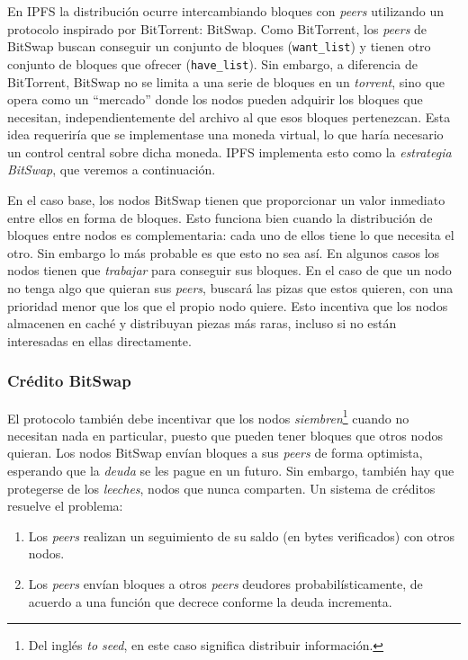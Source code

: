 \documentclass[12pt]{article} %
\begin{document}
En IPFS la distribución ocurre intercambiando bloques con \textit{peers} utilizando un protocolo inspirado por BitTorrent: BitSwap. Como BitTorrent, los \textit{peers} de BitSwap buscan conseguir un conjunto de bloques (\texttt{want\_list}) y tienen otro conjunto de bloques que ofrecer (\texttt{have\_list}). Sin embargo, a diferencia de BitTorrent, BitSwap no se limita a una serie de bloques en un \textit{torrent}, sino que opera como un ``mercado'' donde los nodos pueden adquirir los bloques que necesitan, independientemente del archivo al que esos bloques pertenezcan. Esta idea requeriría que se implementase una moneda virtual, lo que haría necesario un control central sobre dicha moneda. IPFS implementa esto como la \textit{estrategia BitSwap}, que veremos a continuación.

En el caso base, los nodos BitSwap tienen que proporcionar un valor inmediato entre ellos en forma de bloques. Esto funciona bien cuando la distribución de bloques entre nodos es complementaria: cada uno de ellos tiene lo que necesita el otro. Sin embargo lo más probable es que esto no sea así. En algunos casos los nodos tienen que \textit{trabajar} para conseguir sus bloques. En el caso de que un nodo no tenga algo que quieran sus \textit{peers}, buscará las pizas que estos quieren, con una prioridad menor que los que el propio nodo quiere. Esto incentiva que los nodos almacenen en caché y distribuyan piezas más raras, incluso si no están interesadas en ellas directamente.

\subsubsection{Crédito BitSwap} %
\label{ssub:crédito_bitswap}

El protocolo también debe incentivar que los nodos \textit{siembren}\footnote{Del inglés \textit{to seed}, en este caso significa distribuir información.} cuando no necesitan nada en particular, puesto que pueden tener bloques que otros nodos quieran. Los nodos BitSwap envían bloques a sus \textit{peers} de forma optimista, esperando que la \textit{deuda} se les pague en un futuro. Sin embargo, también hay que protegerse de los \textit{leeches}, nodos que nunca comparten. Un sistema de créditos resuelve el problema:
\begin{enumerate}
	\item Los \textit{peers} realizan un seguimiento de su saldo (en bytes verificados) con otros nodos.
	\item Los \textit{peers} envían bloques a otros \textit{peers} deudores probabilísticamente, de acuerdo a una función que decrece conforme la deuda incrementa.
\end{enumerate}
\end{document}
